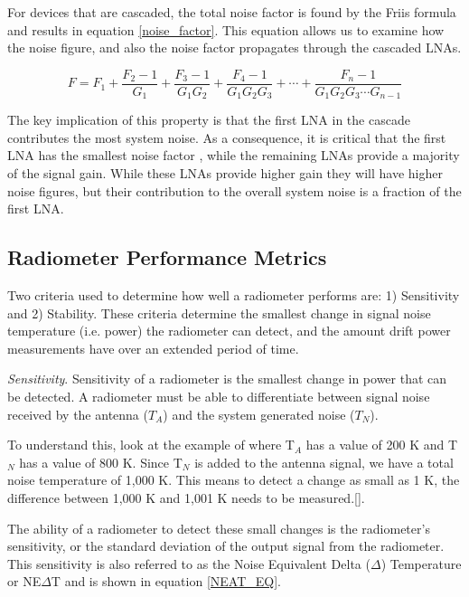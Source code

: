 For devices that are cascaded, the total noise factor is found by the Friis formula and results in equation \ref{noise_factor}.  This equation allows us to examine how the noise figure, and also the noise factor propagates through the cascaded LNAs.  

\begin{equation}\label{noise_factor}
F=F_1+\frac{F_2-1}{G_1}+\frac{F_3-1}{G_1 G_2}+\frac{F_4-1}{G_1 G_2 G_3}+\cdots +\frac{F_n-1}{G_1 G_2 G_3 \cdots G_{n-1}}
\end{equation}

The key implication of this property is that the first LNA in the cascade contributes the most system noise.  As a consequence, it is critical that the first LNA has the smallest noise factor , while the remaining LNAs provide a majority of the signal gain.  While these LNAs provide higher gain they will have higher noise figures, but their contribution to the overall system noise is a fraction of the first LNA.

\subsection{Radiometer Performance Metrics}\label{performance_metrics}

Two criteria used to determine how well a radiometer performs are: 1) Sensitivity and 2) Stability.  These criteria determine the smallest change in signal noise temperature (i.e. power) the radiometer can detect, and the amount drift power measurements have over an extended period of time.

\emph{Sensitivity}.  Sensitivity of a radiometer is the smallest change in power that can be detected.  A radiometer must be able to differentiate between signal noise received by  the antenna ($T_{A}$) and the system generated noise ($T_N$).

To understand this, look at the example of where T$_{A}$ has a value of 200 K and T$_{N}$ has a value of 800 K.  Since T$_{N}$ is added to the antenna signal, we have a total noise temperature of 1,000 K.  This means to detect a change as small as 1 K, the difference between 1,000 K and 1,001 K needs to be measured.[\cite{skou}].

The ability of a radiometer to detect these small changes is the radiometer's sensitivity, or the standard deviation of the output signal from the radiometer.  This sensitivity is also referred to as the Noise Equivalent Delta ($\Delta$) Temperature or NE$\Delta$T and is shown in equation \ref{NEAT_EQ}. 

